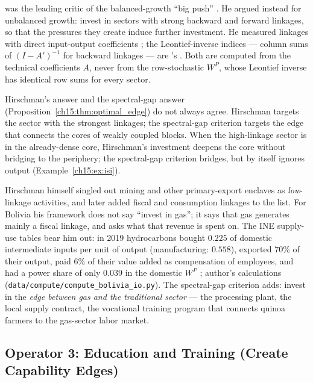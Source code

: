 \documentclass[../structural_economics_book.tex]{subfiles}
\begin{document}
\begin{prebisch}
\citet{hirschman1958strategy} was the leading critic of the balanced-growth ``big push'' \citep{rosensteinrodan1943problems}. He argued instead for unbalanced growth: invest in sectors with strong backward and forward linkages, so that the pressures they create induce further investment. He measured linkages with direct input-output coefficients \citep{chenery1958international}; the Leontief-inverse indices --- column sums of $(I - A')^{-1}$ for backward linkages --- are \citeauthor{rasmussen1956studies}'s \citeyearpar{rasmussen1956studies}. Both are computed from the technical coefficients $A$, never from the row-stochastic $W^P$, whose Leontief inverse has identical row sums for every sector.

Hirschman's answer and the spectral-gap answer (Proposition~\ref{ch15:thm:optimal_edge}) do not always agree. Hirschman targets the sector with the strongest linkages; the spectral-gap criterion targets the edge that connects the cores of weakly coupled blocks. When the high-linkage sector is in the already-dense core, Hirschman's investment deepens the core without bridging to the periphery; the spectral-gap criterion bridges, but by itself ignores output (Example~\ref{ch15:ex:isi}).

Hirschman himself singled out mining and other primary-export enclaves as \emph{low}-linkage activities, and later \citeyearpar{hirschman1977generalized} added fiscal and consumption linkages to the list. For Bolivia his framework does not say ``invest in gas''; it says that gas generates mainly a fiscal linkage, and asks what that revenue is spent on. The INE supply-use tables bear him out: in 2019 hydrocarbons bought $0.225$ of domestic intermediate inputs per unit of output (manufacturing: $0.558$), exported $70\%$ of their output, paid $6\%$ of their value added as compensation of employees, and had a power share of only $0.039$ in the domestic $W^P$ \citep{ine2026sut}; author's calculations (\texttt{data/compute/compute\_bolivia\_io.py}). The spectral-gap criterion adds: invest in the \textit{edge between gas and the traditional sector} --- the processing plant, the local supply contract, the vocational training program that connects quinoa farmers to the gas-sector labor market.
\end{prebisch}


\subsection{Operator 3: Education and Training (Create Capability Edges)}
\end{document}
